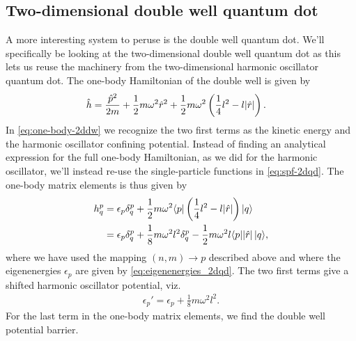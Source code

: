     \subsection{Two-dimensional double well quantum dot}
        A more interesting system to peruse is the double well quantum dot.
        We'll specifically be looking at the two-dimensional double well quantum
        dot as this lets us reuse the machinery from the two-dimensional
        harmonic oscillator quantum dot.
        The one-body Hamiltonian of the double well is given by
        \begin{align}
            \onehamil
            &=
            \frac{\momentum^2}{2m}
            + \half m \omega^2 \position[r]^2
            + \half m \omega^2 \para{
                \frac{1}{4} l^2 - l\abs{\position[r]}
            }.
            \label{eq:one-body-2ddw}
        \end{align}
        In \autoref{eq:one-body-2ddw} we recognize the two first terms as the
        kinetic energy and the harmonic oscillator confining potential.
        Instead of finding an analytical expression for the full one-body
        Hamiltonian, as we did for the harmonic oscillator, we'll instead re-use
        the single-particle functions in \autoref{eq:spf-2dqd}.
        The one-body matrix elements is thus given by
        \begin{align}
            \oneten^{p}_{q}
            &= \epsilon_{p}\delta^{p}_{q}
            + \half m \omega^2\bra{p}\para{
                \frac{1}{4} l^2 - l \abs{\position[r]}
            }\ket{q}
            \\
            &= \epsilon_{p}\delta^{p}_{q}
            + \frac{1}{8} m \omega^2 l^2 \delta^{p}_{q}
            - \half m \omega^2 l \bra{p}\abs{\position[r]}\ket{q},
        \end{align}
        where we have used the mapping $(n, m) \to p$ described above and where
        the eigenenergies $\epsilon_p$ are given by
        \autoref{eq:eigenenergies_2dqd}.
        The two first terms give a shifted harmonic oscillator potential, viz.
        \begin{align}
            \epsilon_p' = \epsilon_p + \frac{1}{8} m \omega^2 l^2.
        \end{align}
        For the last term in the one-body matrix elements, we find the double
        well potential barrier.
